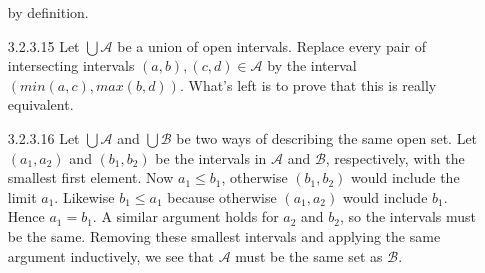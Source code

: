 \documentclass{article}
\begin{document}
\begin{enumerate}
  by definition.
\item[]
\item[3.2.3.15]
  Let $\bigcup \mathcal{A}$ be a union of open intervals. 
  Replace every pair of intersecting intervals $(a, b), (c, d) \in \mathcal{A}$
  by the interval $(min(a, c), max(b, d))$. 
  What's left is to prove that this is really equivalent. %
\item[]
\item[3.2.3.16]
  Let $\bigcup \mathcal{A}$ and $\bigcup \mathcal{B}$ be two ways of
  describing the same open set. Let $(a_1, a_2)$ and $(b_1, b_2)$
  be the intervals in 
  $\mathcal{A}$ and $\mathcal{B}$, respectively,
  with the smallest first element. 
  Now $a_1 \le b_1$, otherwise $(b_1, b_2)$ would include the limit $a_1$.
  Likewise $b_1 \le a_1$ because 
  otherwise $(a_1, a_2)$ would include $b_1$. Hence $a_1 = b_1$. 
  A similar argument holds for $a_2$ and $b_2$, so the intervals 
  must be the same. Removing these smallest intervals and applying the
  same argument inductively, we see that $\mathcal{A}$ must be the 
  same set as $\mathcal{B}$.
\item[]
\end{enumerate}
\end{document}
